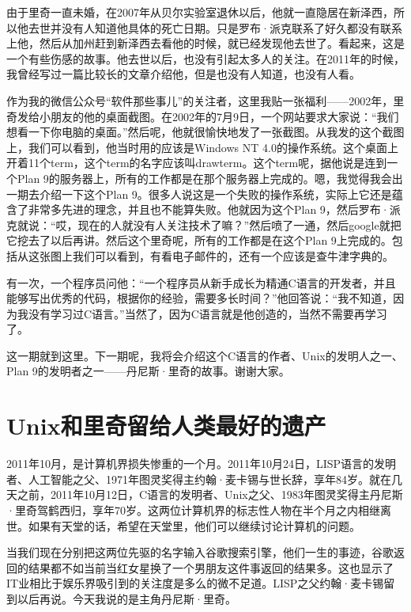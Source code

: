 \documentclass[
  letterpaper,
  DIV=11,
  numbers=noendperiod]{scrreprt}
\begin{document}
由于里奇一直未婚，在2007年从贝尔实验室退休以后，他就一直隐居在新泽西，所以他去世并没有人知道他具体的死亡日期。只是罗布·派克联系了好久都没有联系上他，然后从加州赶到新泽西去看他的时候，就已经发现他去世了。看起来，这是一个有些伤感的故事。他去世以后，也没有引起太多人的关注。在2011年的时候，我曾经写过一篇比较长的文章介绍他，但是也没有人知道，也没有人看。

作为我的微信公众号``软件那些事儿''的关注者，这里我贴一张福利------2002年，里奇发给小朋友的他的桌面截图。在2002年的7月9日，一个网站要求大家说：``我们想看一下你电脑的桌面。''然后呢，他就很愉快地发了一张截图。从我发的这个截图上，我们可以看到，他当时用的应该是Windows
NT
4.0的操作系统。这个桌面上开着11个term，这个term的名字应该叫drawterm。这个term呢，据他说是连到一个Plan
9的服务器上，所有的工作都是在那个服务器上完成的。嗯，我觉得我会出一期去介绍一下这个Plan
9。很多人说这是一个失败的操作系统，实际上它还是蕴含了非常多先进的理念，并且也不能算失败。他就因为这个Plan
9，然后罗布·派克就说：``哎，现在的人就没有人关注技术了嘛？''然后喷了一通，然后google就把它挖去了以后再讲。然后这个里奇呢，所有的工作都是在这个Plan
9上完成的。包括从这张图上我们可以看到，有看电子邮件的，还有一个应该是查牛津字典的。

有一次，一个程序员问他：``一个程序员从新手成长为精通C语言的开发者，并且能够写出优秀的代码，根据你的经验，需要多长时间？''他回答说：``我不知道，因为我没有学习过C语言。''当然了，因为C语言就是他创造的，当然不需要再学习了。

这一期就到这里。下一期呢，我将会介绍这个C语言的作者、Unix的发明人之一、Plan
9的发明者之一------丹尼斯·里奇的故事。谢谢大家。


\chapter{Unix和里奇留给人类最好的遗产}\label{unixux548cux91ccux5947ux7559ux7ed9ux4ebaux7c7bux6700ux597dux7684ux9057ux4ea7}

2011年10月，是计算机界损失惨重的一个月。2011年10月24日，LISP语言的发明者、人工智能之父、1971年图灵奖得主约翰·麦卡锡与世长辞，享年84岁。就在几天之前，2011年10月12日，C语言的发明者、Unix之父、1983年图灵奖得主丹尼斯·里奇驾鹤西归，享年70岁。这两位计算机界的标志性人物在半个月之内相继离世。如果有天堂的话，希望在天堂里，他们可以继续讨论计算机的问题。

当我们现在分别把这两位先驱的名字输入谷歌搜索引擎，他们一生的事迹，谷歌返回的结果都不如当前当红女星换了一个男朋友这件事返回的结果多。这也显示了IT业相比于娱乐界吸引到的关注度是多么的微不足道。LISP之父约翰·麦卡锡留到以后再说。今天我说的是主角丹尼斯·里奇。
\end{document}
